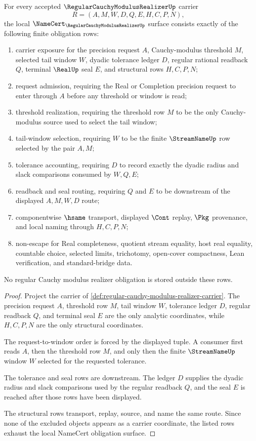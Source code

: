 \begin{theorem}
\label{thm:regular-cauchy-modulus-realizer-namecert-obligations}
For every accepted $\RegularCauchyModulusRealizerUp$ carrier
$$
R=(A,M,W,D,Q,E,H,C,P,N),
$$
the local $\NameCert_{\RegularCauchyModulusRealizerUp}$ surface consists exactly of the following finite obligation rows:
\begin{enumerate}
\item carrier exposure for the precision request $A$, Cauchy-modulus threshold $M$, selected tail window $W$, dyadic tolerance ledger $D$, regular rational readback $Q$, terminal $\RealUp$ seal $E$, and structural rows $H,C,P,N$;
\item request admission, requiring the Real or Completion precision request to enter through $A$ before any threshold or window is read;
\item threshold realization, requiring the threshold row $M$ to be the only Cauchy-modulus source used to select the tail window;
\item tail-window selection, requiring $W$ to be the finite $\StreamNameUp$ row selected by the pair $A,M$;
\item tolerance accounting, requiring $D$ to record exactly the dyadic radius and slack comparisons consumed by $W,Q,E$;
\item readback and seal routing, requiring $Q$ and $E$ to be downstream of the displayed $A,M,W,D$ route;
\item componentwise $\hsame$ transport, displayed $\Cont$ replay, $\Pkg$ provenance, and local naming through $H,C,P,N$;
\item non-escape for Real completeness, quotient stream equality, host real equality, countable choice, selected limits, trichotomy, open-cover compactness, Lean verification, and standard-bridge data.
\end{enumerate}
No regular Cauchy modulus realizer obligation is stored outside these rows.
\end{theorem}
\begin{proof}
Project the carrier of \autoref{def:regular-cauchy-modulus-realizer-carrier}. The precision request $A$, threshold row $M$, tail window $W$, tolerance ledger $D$, regular readback $Q$, and terminal seal $E$ are the only analytic coordinates, while $H,C,P,N$ are the only structural coordinates.

The request-to-window order is forced by the displayed tuple. A consumer first reads $A$, then the threshold row $M$, and only then the finite $\StreamNameUp$ window $W$ selected for the requested tolerance.

The tolerance and seal rows are downstream. The ledger $D$ supplies the dyadic radius and slack comparisons used by the regular readback $Q$, and the seal $E$ is reached after those rows have been displayed.

The structural rows transport, replay, source, and name the same route. Since none of the excluded objects appears as a carrier coordinate, the listed rows exhaust the local NameCert obligation surface.
\end{proof}


